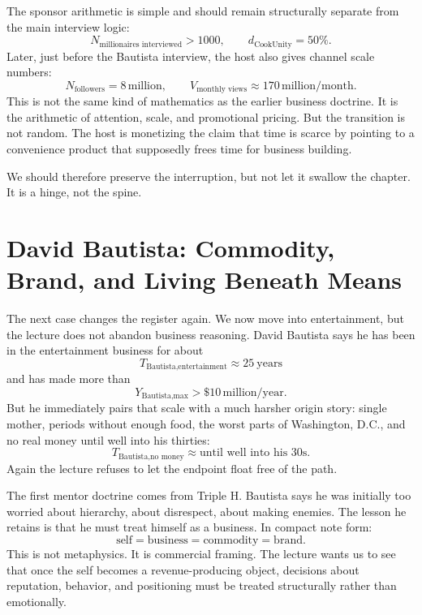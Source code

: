 The sponsor arithmetic is simple and should remain structurally separate from the main interview logic:
\begin{equation}
N_{\text{millionaires interviewed}} > 1000,\qquad
d_{\text{CookUnity}} = 50\%.
\end{equation}
Later, just before the Bautista interview, the host also gives channel scale numbers:
\begin{equation}
N_{\text{followers}} = 8\,\text{million},\qquad
V_{\text{monthly views}} \approx 170\,\text{million/month}.
\end{equation}
This is not the same kind of mathematics as the earlier business doctrine. It is the arithmetic of attention, scale, and promotional pricing. But the transition is not random. The host is monetizing the claim that time is scarce by pointing to a convenience product that supposedly frees time for business building.

We should therefore preserve the interruption, but not let it swallow the chapter. It is a hinge, not the spine.

\section{David Bautista: Commodity, Brand, and Living Beneath Means}

The next case changes the register again. We now move into entertainment, but the lecture does not abandon business reasoning. David Bautista says he has been in the entertainment business for about
\begin{equation}
T_{\text{Bautista,entertainment}} \approx 25\ \text{years}
\end{equation}
and has made more than
\begin{equation}
Y_{\text{Bautista,max}} > \$10\,\text{million/year}.
\end{equation}
But he immediately pairs that scale with a much harsher origin story: single mother, periods without enough food, the worst parts of Washington, D.C., and no real money until well into his thirties:
\begin{equation}
T_{\text{Bautista,no money}} \approx \text{until well into his 30s}.
\end{equation}
Again the lecture refuses to let the endpoint float free of the path.

The first mentor doctrine comes from Triple H. Bautista says he was initially too worried about hierarchy, about disrespect, about making enemies. The lesson he retains is that he must treat himself as a business. In compact note form:
\begin{equation}
\text{self} = \text{business} = \text{commodity} = \text{brand}.
\end{equation}
This is not metaphysics. It is commercial framing. The lecture wants us to see that once the self becomes a revenue-producing object, decisions about reputation, behavior, and positioning must be treated structurally rather than emotionally.

